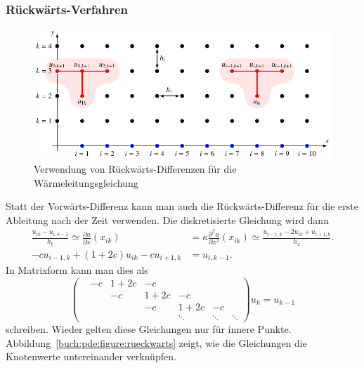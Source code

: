 \subsubsection{Rückwärts-Verfahren}
\begin{figure}
\centering
\includegraphics{chapters/70-pde/images/rueckwaerts.pdf}
\caption{Verwendung von Rückwärts-Differenzen für die Wärmeleitungsgleichung
\label{buch:pde:figure:rueckwaerts}}
\end{figure}
Statt der Vorwärts-Differenz kann man auch die Rückwärts-Differenz für
die erste Ableitung nach der Zeit verwenden.
Die diskretisierte Gleichung wird dann
\begin{align*}
\frac{u_{ik}-u_{i,k-1}}{h_t}
\simeq
\frac{\partial u}{\partial x}(x_{ik})
&=
\kappa\frac{\partial^2 u}{\partial x^2}(x_{ik})
\simeq
\frac{u_{i-1,k}-2u_{ik} + u_{i+1,k}}{h_x}.
\\
-cu_{i-1,k}
+
(1+2c)u_{ik}
-cu_{i+1,k}
&=u_{i,k-1}.
\end{align*}
In Matrixform kann man dies als
\[
\begin{pmatrix}
      &    -c&  1+2c& -c &      &      &      \\
      &      &   -c &1+2c& -c   &      &      \\
      &      &      & -c &1+2c  & -c   &      \\
      &      &      &    &\ddots&\ddots&\ddots
\end{pmatrix}
u_k
=
u_{k-1}
\]
schreiben.
Wieder gelten diese Gleichungen nur für innere Punkte.
Abbildung~\ref{buch:pde:figure:rueckwarts} zeigt, wie die Gleichungen
die Knotenwerte untereinander verknüpfen.


